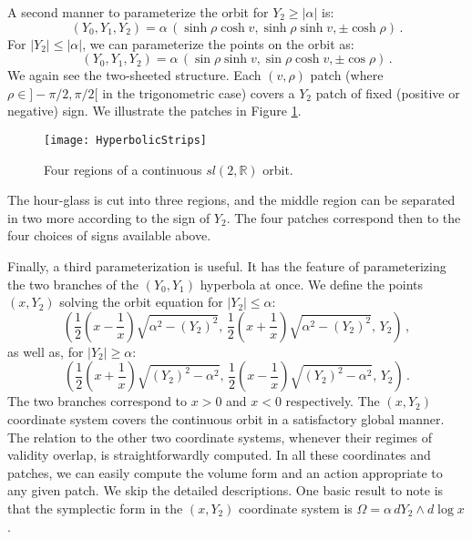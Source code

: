 \documentclass[12pt]{article}
\numberwithin{equation}{section}
\newcommand{\be}{\begin{equation}}
\newcommand{\ee}{\end{equation}}
\numberwithin{equation}{section}
\numberwithin{table}{section}\setlength{\multlinegap}{25pt}
\begin{document}
%
A second manner to parameterize the orbit for $Y_2 \ge |\alpha|$ is:
\begin{equation}
(Y_0,Y_1,Y_2)= \alpha\, \left(  \sinh \rho \cosh v,  \sinh \rho \sinh v, \pm \cosh \rho \right) \, .
\label{RoevOne}
\end{equation}
%
For $|Y_2| \le |\alpha|$, we can parameterize the points on the orbit as:
\begin{equation}
(Y_0,Y_1,Y_2)= \alpha\, \left(  \sin \rho \sinh v,  \sin \rho \cosh v,  \pm \cos \rho \right) \, .
\label{RoevTwo}
\end{equation}
We again see the two-sheeted structure. Each $(v,\rho)$ patch (where $\rho \in ] -\pi/2,\pi/2[$ in the trigonometric case) covers a $Y_2$ patch of fixed (positive or negative) sign. We  illustrate the patches in Figure \ref{HyperbolicStrips}. 
\begin{figure}
\begin{center}
\texttt{[image: HyperbolicStrips]}
\end{center}
\caption{Four regions of a continuous $sl(2,\mathbb{R})$ orbit.}
\label{HyperbolicStrips}
\end{figure}
The hour-glass is cut into three regions, and the middle region can be separated in two more according to the sign of $Y_2$. The four patches correspond then to the four choices of signs available above. 

Finally, a third parameterization is useful. It has the feature of parameterizing the two branches of the $(Y_0,Y_1)$ hyperbola at once. We define the points $(x,Y_2)$ solving the orbit equation for $|Y_2|\le \alpha$:
\begin{equation}
\label{Y2<alphapatch}
\left( \frac12(x-\frac{1}{x}) \sqrt{\alpha^2-(Y_2)^2}, \, \frac12  (x+\frac{1}{x}) \sqrt{\alpha^2-(Y_2)^2},\, Y_2 \right) \, ,
\end{equation}
as well as, for $|Y_2| \ge \alpha$:
\begin{equation}
\label{Y2>alphapatch}
\left( \frac12 (x+\frac{1}{x}) \sqrt{(Y_2)^2-\alpha^2},\,   \frac12 (x-\frac{1}{x}) \sqrt{(Y_2)^2-\alpha^2},\, Y_2\right) \, .
\end{equation}
The two branches correspond to $x>0$ and $x<0$ respectively. The $(x,Y_2)$ coordinate system covers the continuous orbit in a satisfactory global manner. The relation to the other two coordinate systems, whenever their regimes of validity overlap, is straightforwardly computed. 
In all these coordinates and patches, we can easily compute the volume form and an action appropriate to any given patch. We skip the detailed descriptions. One basic result to note is that the symplectic form in the $(x,Y_2)$ coordinate system is  $ \Omega=\alpha \, d Y_2 \wedge  d \log x$. 
\end{document}
